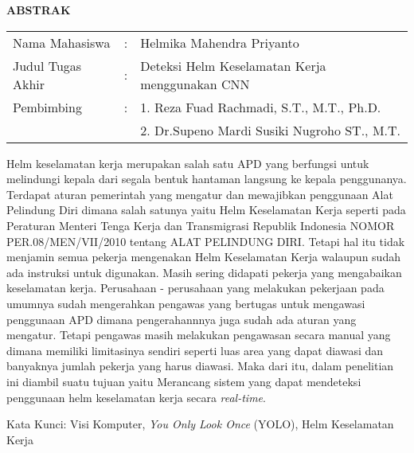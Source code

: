 \begin{center}
  \large\textbf{ABSTRAK}
\end{center}


\vspace{2ex}

\begingroup
  \setlength{\tabcolsep}{0pt}

  \noindent
  \begin{tabularx}{\textwidth}{l >{\centering}m{2em} X}
    Nama Mahasiswa    &:& Helmika Mahendra Priyanto \\

    Judul Tugas Akhir &:&	Deteksi Helm Keselamatan Kerja menggunakan CNN \\

    Pembimbing        &:& 1. Reza Fuad Rachmadi, S.T., M.T., Ph.D. \\
                      & & 2. Dr.Supeno Mardi Susiki Nugroho ST., M.T. \\
  \end{tabularx}
\endgroup

\par Helm keselamatan kerja merupakan salah satu APD  yang berfungsi 
untuk melindungi kepala dari segala bentuk hantaman langsung ke kepala penggunanya. Terdapat aturan 
pemerintah yang mengatur dan mewajibkan penggunaan Alat Pelindung Diri dimana salah satunya yaitu 
Helm Keselamatan Kerja seperti pada Peraturan Menteri Tenga Kerja dan Transmigrasi Republik 
Indonesia NOMOR PER.08/MEN/VII/2010 tentang ALAT PELINDUNG DIRI. Tetapi hal itu tidak menjamin 
semua pekerja mengenakan Helm Keselamatan Kerja walaupun sudah ada instruksi untuk digunakan. 
Masih sering didapati pekerja yang mengabaikan keselamatan kerja. Perusahaan - perusahaan yang 
melakukan pekerjaan pada umumnya sudah mengerahkan pengawas yang bertugas untuk mengawasi 
penggunaan APD dimana pengerahannnya juga sudah ada aturan yang mengatur. Tetapi pengawas 
masih melakukan pengawasan secara manual yang dimana memiliki limitasinya sendiri seperti 
luas area yang dapat diawasi dan banyaknya jumlah pekerja yang harus diawasi. Maka dari itu, 
dalam penelitian ini diambil suatu tujuan yaitu Merancang sistem yang dapat mendeteksi 
penggunaan helm keselamatan kerja secara \emph{real-time}. 

Kata Kunci: Visi Komputer, \emph{You Only Look Once} (YOLO), Helm Keselamatan Kerja
